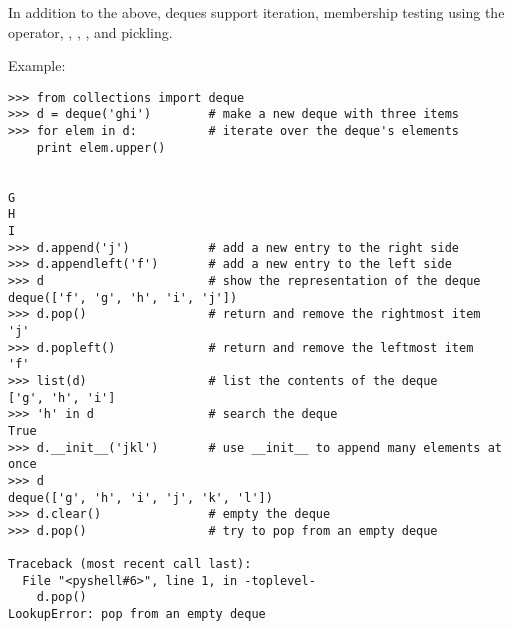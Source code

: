 In addition to the above, deques support iteration, membership testing
using the  operator, , ,
, and pickling.

Example:

\begin{verbatim}
>>> from collections import deque
>>> d = deque('ghi')        # make a new deque with three items
>>> for elem in d:          # iterate over the deque's elements
	print elem.upper()

	
G
H
I
>>> d.append('j')           # add a new entry to the right side
>>> d.appendleft('f')       # add a new entry to the left side
>>> d                       # show the representation of the deque
deque(['f', 'g', 'h', 'i', 'j'])
>>> d.pop()                 # return and remove the rightmost item
'j'
>>> d.popleft()             # return and remove the leftmost item
'f'
>>> list(d)                 # list the contents of the deque
['g', 'h', 'i']
>>> 'h' in d                # search the deque
True
>>> d.__init__('jkl')       # use __init__ to append many elements at once
>>> d
deque(['g', 'h', 'i', 'j', 'k', 'l'])
>>> d.clear()               # empty the deque
>>> d.pop()                 # try to pop from an empty deque

Traceback (most recent call last):
  File "<pyshell#6>", line 1, in -toplevel-
    d.pop()
LookupError: pop from an empty deque
\end{verbatim}    
